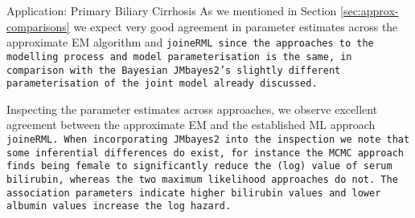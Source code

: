 \begin{chapter}{\label{cha:app-PBC}Application: Primary Biliary Cirrhosis}
  As we mentioned in Section \ref{sec:approx-comparisons} we expect very good agreement in parameter estimates across the approximate EM algorithm and \tt{joineRML} since the approaches to the modelling process and model parameterisation is the same, in comparison with the Bayesian \tt{JMbayes2}'s slightly different parameterisation of the joint model already discussed.

  Inspecting the parameter estimates across approaches, we observe excellent agreement between the approximate EM and the established ML approach \tt{joineRML}. When incorporating \tt{JMbayes2} into the inspection we note that some inferential differences do exist, for instance the MCMC approach finds being female to significantly reduce the (log) value of serum bilirubin, whereas the two maximum likelihood approaches do not. The association parameters indicate higher bilirubin values and lower albumin values increase the log hazard. 
  

\end{chapter}

